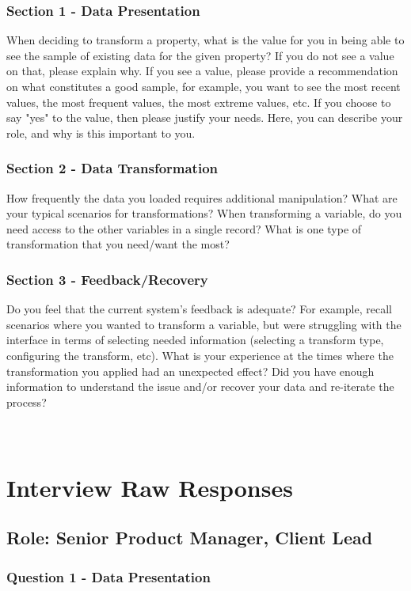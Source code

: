 \documentclass[12pt,letterpaper]{article}
\begin{document}
\subsubsection*{Section 1 - Data Presentation}
When deciding to transform a property, what is the value for you in being able to see the sample of existing data for the given property? If you do not see a value on that, please explain why.  If you see a value, please provide a recommendation on what constitutes a good sample, for example, you want to see the most recent values, the most frequent values, the most extreme values, etc. If you choose to say "yes" to the value, then please justify your needs. Here, you can describe your role, and why is this important to you.  

\subsubsection*{Section 2 - Data Transformation}
How frequently the data you loaded requires additional manipulation? What are your typical scenarios for transformations? When transforming a variable, do you need access to the other variables in a single record? What is one type of transformation that you need/want the most?  

\subsubsection*{Section 3 - Feedback/Recovery}
Do you feel that the current system's feedback is adequate? For example, recall scenarios where you wanted to transform a variable, but were struggling with the interface in terms of selecting needed information (selecting a transform type, configuring the transform, etc). What is your experience at the times where the transformation you applied had an unexpected effect? Did you have enough information to understand the issue and/or recover your data and re-iterate the process?

\section{\\Interview Raw Responses}

\subsection*{Role: Senior Product Manager, Client Lead}
\subsubsection*{Question 1 - Data Presentation} 
\end{document}
